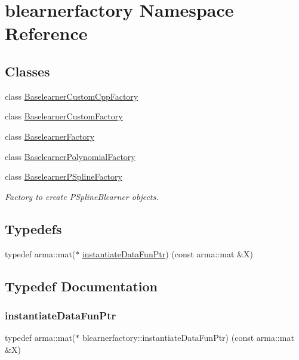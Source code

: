 \hypertarget{namespaceblearnerfactory}{}\section{blearnerfactory Namespace Reference}
\label{namespaceblearnerfactory}
\subsection*{Classes}
\begin{DoxyCompactItemize}
\item 
class \hyperlink{classblearnerfactory_1_1_baselearner_custom_cpp_factory}{Baselearner\+Custom\+Cpp\+Factory}
\item 
class \hyperlink{classblearnerfactory_1_1_baselearner_custom_factory}{Baselearner\+Custom\+Factory}
\item 
class \hyperlink{classblearnerfactory_1_1_baselearner_factory}{Baselearner\+Factory}
\item 
class \hyperlink{classblearnerfactory_1_1_baselearner_polynomial_factory}{Baselearner\+Polynomial\+Factory}
\item 
class \hyperlink{classblearnerfactory_1_1_baselearner_p_spline_factory}{Baselearner\+P\+Spline\+Factory}
\begin{DoxyCompactList}\small\item\em Factory to create {\ttfamily P\+Spline\+Blearner} objects. \end{DoxyCompactList}\end{DoxyCompactItemize}
\subsection*{Typedefs}
\begin{DoxyCompactItemize}
\item 
typedef arma\+::mat($\ast$ \hyperlink{namespaceblearnerfactory_a74e80c9723f4fa8866e09a04dfa3035b}{instantiate\+Data\+Fun\+Ptr}) (const arma\+::mat \&X)
\end{DoxyCompactItemize}


\subsection{Typedef Documentation}
\mbox{\label{namespaceblearnerfactory_a74e80c9723f4fa8866e09a04dfa3035b}} 
\subsubsection{\texorpdfstring{instantiate\+Data\+Fun\+Ptr}{instantiateDataFunPtr}}
{\footnotesize\ttfamily typedef arma\+::mat($\ast$ blearnerfactory\+::instantiate\+Data\+Fun\+Ptr) (const arma\+::mat \&X)}

